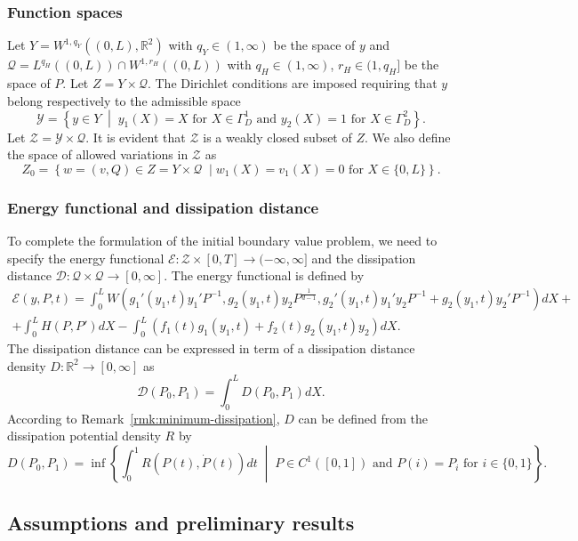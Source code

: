 \documentclass[a4paper,10pt,oneside]{amsbook}
\numberwithin{section}{chapter}
\numberwithin{equation}{chapter}
\theoremstyle{definition}
\begin{document}
\subsubsection*{Function spaces}

Let $Y=W^{1,q_Y}((0,L),\mathbb{R}^2)$ with $q_Y\in(1,\infty)$ be the space of $y$ and $\mathscr{Q}=L^{q_H}((0,L))\cap W^{1,r_H}((0,L))$ with $q_H\in(1,\infty)$, $r_H\in(1,q_H]$ be the space of $P$. Let $Z=Y\times\mathscr{Q}$. The Dirichlet conditions are imposed requiring that $y$ belong respectively to the admissible space
\[
\mathscr{Y}=\left\{y\in Y\;\middle|\;\text{$y_1(X)=X$ for $X\in\Gamma_D^1$ and $y_2(X)=1$ for $X\in\Gamma_D^2$}\right\}.
\]
Let $\mathscr{Z}=\mathscr{Y}\times\mathscr{Q}$. It is evident that $\mathscr{Z}$ is a weakly closed subset of $Z$. We also define the space of allowed variations in $\mathscr{Z}$ as
\[
Z_0=\left\{w=(v,Q)\in Z=Y\times\mathscr{Q}\;\middle|\text{$w_1(X)=v_1(X)=0$ for $X\in\{0,L\}$}\right\}.
\]

\subsubsection*{Energy functional and dissipation distance}

To complete the formulation of the initial boundary value problem, we need to specify the energy functional $\mathcal{E}\colon\mathscr{Z}\times[0,T]\to(-\infty,\infty]$ and the dissipation distance $\mathcal{D}\colon\mathscr{Q}\times\mathscr{Q}\to[0,\infty]$. The energy functional is defined by
\begin{multline*}
\mathcal{E}(y,P,t)=\int_0^L W\left(g_1'(y_1,t)y_1'P^{-1},g_2(y_1,t)y_2P^\frac{1}{d-1},g_2'(y_1,t)y_1'y_2P^{-1}+g_2(y_1,t)y_2'P^{-1}\right)dX+\\
+\int_0^LH(P,P')dX-\int_0^L\left(f_1(t)g_1(y_1,t)+f_2(t)g_2(y_1,t)y_2\right)dX.
\end{multline*}
The dissipation distance can be expressed in term of a dissipation distance density $D\colon\mathbb{R}^2\to[0,\infty]$ as
\[
\mathcal{D}(P_0,P_1)=\int_0^LD(P_0,P_1)dX.
\]
According to Remark~\ref{rmk:minimum-dissipation}, $D$ can be defined from the dissipation potential density $R$ by
\begin{equation}
\label{eqn:dissipation-distance-density}
D(P_0,P_1)=\inf\left\{\int_0^1R(P(t),\dot{P}(t))dt\;\middle|\;\text{$P\in C^1([0,1])$ and $P(i)=P_i$ for $i\in\{0,1\}$}\right\}.
\end{equation}

\subsection{Assumptions and preliminary results}
\end{document}
